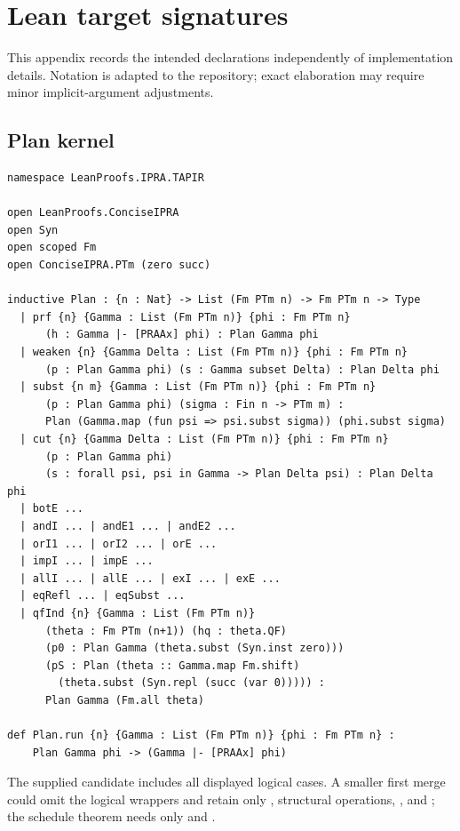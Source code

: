\section{Lean target signatures}\label{app:signatures}

This appendix records the intended declarations independently of implementation details.  Notation is
adapted to the repository; exact elaboration may require minor implicit-argument adjustments.

\subsection{Plan kernel}

\begin{lstlisting}[language=Lean]
namespace LeanProofs.IPRA.TAPIR

open LeanProofs.ConciseIPRA
open Syn
open scoped Fm
open ConciseIPRA.PTm (zero succ)

inductive Plan : {n : Nat} -> List (Fm PTm n) -> Fm PTm n -> Type
  | prf {n} {Gamma : List (Fm PTm n)} {phi : Fm PTm n}
      (h : Gamma |- [PRAAx] phi) : Plan Gamma phi
  | weaken {n} {Gamma Delta : List (Fm PTm n)} {phi : Fm PTm n}
      (p : Plan Gamma phi) (s : Gamma subset Delta) : Plan Delta phi
  | subst {n m} {Gamma : List (Fm PTm n)} {phi : Fm PTm n}
      (p : Plan Gamma phi) (sigma : Fin n -> PTm m) :
      Plan (Gamma.map (fun psi => psi.subst sigma)) (phi.subst sigma)
  | cut {n} {Gamma Delta : List (Fm PTm n)} {phi : Fm PTm n}
      (p : Plan Gamma phi)
      (s : forall psi, psi in Gamma -> Plan Delta psi) : Plan Delta phi
  | botE ...
  | andI ... | andE1 ... | andE2 ...
  | orI1 ... | orI2 ... | orE ...
  | impI ... | impE ...
  | allI ... | allE ... | exI ... | exE ...
  | eqRefl ... | eqSubst ...
  | qfInd {n} {Gamma : List (Fm PTm n)}
      (theta : Fm PTm (n+1)) (hq : theta.QF)
      (p0 : Plan Gamma (theta.subst (Syn.inst zero)))
      (pS : Plan (theta :: Gamma.map Fm.shift)
        (theta.subst (Syn.repl (succ (var 0))))) :
      Plan Gamma (Fm.all theta)

def Plan.run {n} {Gamma : List (Fm PTm n)} {phi : Fm PTm n} :
    Plan Gamma phi -> (Gamma |- [PRAAx] phi)
\end{lstlisting}

The supplied candidate includes all displayed logical cases.  A smaller first merge could omit the
logical wrappers and retain only , structural operations, , and ; the
schedule theorem needs only  and .

